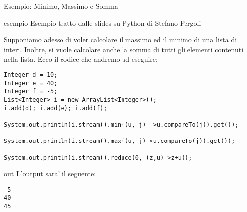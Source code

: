 \documentclass{beamer}
\begin{document}
\begin{frame}[fragile]{Esempio: Minimo, Massimo e Somma}
\fontsize{8pt}{7.2}\selectfont
{}
\begin{beamercolorbox}{esempio}
Esempio tratto dalle slides su Python di Stefano Pergoli
\end{beamercolorbox}
\fontsize{11pt}{7.2}\selectfont
\begin{flushleft}
Supponiamo adesso di voler calcolare il massimo ed il minimo di una lista di interi. Inoltre, si vuole calcolare anche la somma di tutti gli elementi contenuti nella lista. Ecco il codice che andremo ad eseguire:
\end{flushleft}
\begin{lstlisting}
Integer d = 10;
Integer e = 40;
Integer f = -5;		
List<Integer> i = new ArrayList<Integer>();		
i.add(d); i.add(e); i.add(f);
		
System.out.println(i.stream().min((u, j) ->u.compareTo(j)).get());
		
System.out.println(i.stream().max((u, j)->u.compareTo(j)).get());
		
System.out.println(i.stream().reduce(0, (z,u)->z+u));
\end{lstlisting}
\begin{beamercolorbox}{out}
L'output sara' il seguente:
\end{beamercolorbox}
\begin{lstlisting}
-5
40
45
\end{lstlisting}
\end{frame}
\end{document}
